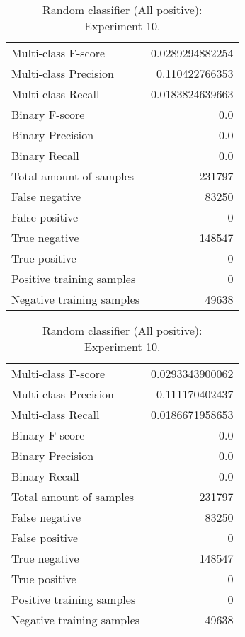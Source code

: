 \begin{table}[H]
\begin{minipage}{0.5\textwidth}
\caption{Random classifier (All positive): \\Experiment 9.}
\centering
\begin{tabular}{l r}
\toprule
Multi-class F-score & 0.0289294882254 \\
Multi-class Precision & 0.110422766353 \\
Multi-class Recall & 0.0183824639663 \\
\midrule
Binary F-score & 0.0 \\
Binary Precision & 0.0 \\
Binary Recall & 0.0 \\
\midrule
Total amount of samples & 231797 \\
False negative & 83250 \\
False positive & 0 \\
True negative & 148547 \\
True positive & 0 \\
\midrule
Positive training samples & 0 \\
Negative training samples & 49638 \\
\bottomrule
\end{tabular}
\end{minipage}
\hfillx
\begin{minipage}{0.5\textwidth}
\caption{Random classifier (All positive): \\Experiment 10.}
\centering
\begin{tabular}{l r}
\toprule
Multi-class F-score & 0.0293343900062 \\
Multi-class Precision & 0.111170402437 \\
Multi-class Recall & 0.0186671958653 \\
\midrule
Binary F-score & 0.0 \\
Binary Precision & 0.0 \\
Binary Recall & 0.0 \\
\midrule
Total amount of samples & 231797 \\
False negative & 83250 \\
False positive & 0 \\
True negative & 148547 \\
True positive & 0 \\
\midrule
Positive training samples & 0 \\
Negative training samples & 49638 \\
\bottomrule
\end{tabular}
\end{minipage}
\end{table}
